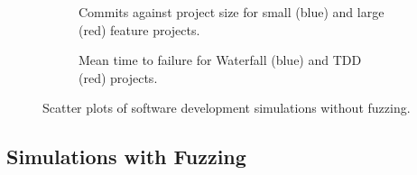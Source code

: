 \documentclass{llncs}
\begin{document}
\begin{figure}
  \centering

  \begin{subfigure}{2.3in}
    \caption{Commits against project size for small (blue) and large (red) feature projects.}
    \label{fig:no-fuzzing:features}

  \end{subfigure}
  \hfill
  \begin{subfigure}{2.3in}
    \caption{Mean time to failure for Waterfall (blue) and TDD (red) projects.}  
    \label{fig:no-fuzzing:mtf}
  \end{subfigure}
  
  \caption{Scatter plots of software development simulations without fuzzing.}
  \label{fig:no-fuzzing}
\end{figure}


\subsection{Simulations with Fuzzing}
\end{document}
